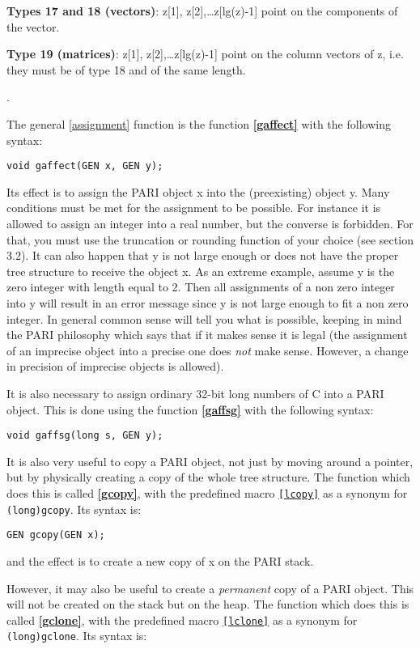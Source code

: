 {\bf Types 17 and 18 (vectors)}: 
z[1], z[2],\dots z[lg(z)-1] point on the components
of the vector.

{\bf Type 19 (matrices)}: 
z[1], z[2],\dots z[lg(z)-1] point on the column vectors
of z, i.e. they must be of type 18 and of the same length.

.

The general \ref{assignment} function is the function {\bf \ref{gaffect}} with
the following syntax:

{\tt void gaffect(GEN x, GEN y);}

Its effect is to assign the PARI object x into the (preexisting) object y.
Many conditions must be met for the assignment to be possible. For instance it is
allowed to assign an integer into a real number, but the converse is forbidden.
For that, you must use the truncation or rounding function of your choice
(see section 3.2). It can
also happen that y is not large enough or does not have the proper tree structure
to receive the object x. As an extreme example, assume y is the zero integer with
length equal to 2. Then all assignments of a non zero integer into y will
result in an error message since y is not large enough to fit a non zero integer.
In general common sense will tell you what is possible, keeping in mind the
PARI philosophy which says that if it makes sense it is legal (the assignment of
an imprecise object into a precise one does {\it not\/} make sense. However,
a change in precision of imprecise objects is allowed).

It is also necessary to assign ordinary 32-bit long numbers of C into a PARI
object. This is done using the function {\bf \ref{gaffsg}} with the following syntax:

{\tt void gaffsg(long s, GEN y);}

It is also very useful to copy a PARI object, not just by moving around a pointer,
but by physically creating a copy of the whole tree structure. The function
which does this is called {\bf \ref{gcopy}}, with the predefined macro 
{\tt \ref{lcopy}} as a synonym for {\tt (long)gcopy}. Its syntax is:

{\tt GEN gcopy(GEN x);}

and the effect is to create a new copy of x on the PARI stack.

However, it may also be useful to create a {\sl permanent} copy of a PARI
object. This will not be created on the stack but on the heap. The function
which does this is called {\bf \ref{gclone}}, with the predefined macro 
{\tt \ref{lclone}} as a synonym for {\tt (long)gclone}. Its syntax is:

